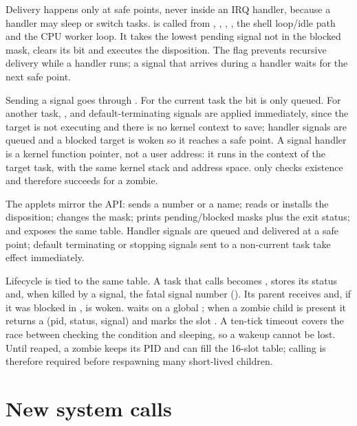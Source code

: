 Delivery happens only at safe points, never inside an IRQ handler, because a
handler may sleep or switch tasks.  is called from
, , , , the
shell loop/idle path and the CPU worker loop. It takes the lowest pending
signal not in the blocked mask, clears its bit and executes the disposition.
The  flag prevents recursive delivery while a handler runs;
a signal that arrives during a handler waits for the next safe point.

Sending a signal goes through . For the current
task the bit is only queued. For another task, , 
and default-terminating signals are applied immediately, since the target is
not executing and there is no kernel context to save; handler signals are
queued and a blocked target is woken so it reaches a safe point. A signal
handler is a kernel function pointer, not a user address: it runs in the
context of the target task, with the same kernel stack and address space.
 only checks existence and therefore succeeds for a
zombie.

The applets mirror the API:  sends a number or a name;
 reads or installs the disposition;  changes
the mask;  prints pending/blocked masks plus the exit status; and
 exposes the same table. Handler signals are queued and
delivered at a safe point; default terminating or stopping signals sent to a
non-current task take effect immediately.

Lifecycle is tied to the same table. A task that calls
 becomes , stores its
status and, when killed by a signal, the fatal signal number
(). Its parent receives  and, if it was blocked
in , is woken.  waits on a global
; when a zombie child is present it returns a
 (pid, status, signal) and marks the slot . A
ten-tick timeout covers the race between checking the condition and sleeping,
so a wakeup cannot be lost. Until reaped, a zombie keeps its PID and can
fill the 16-slot table; calling  is therefore required before
respawning many short-lived children.

\section{New system calls}

